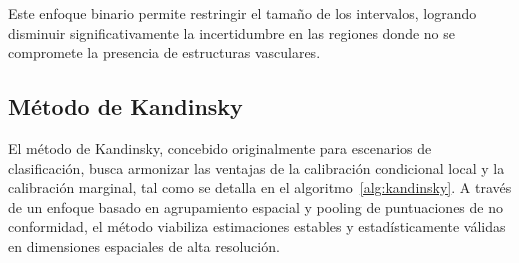 Este enfoque binario permite restringir el tamaño de los intervalos, logrando disminuir significativamente la incertidumbre en las regiones donde no se compromete la presencia de estructuras vasculares.

\subsection{Método de Kandinsky}

El método de Kandinsky, concebido originalmente para escenarios de clasificación, busca armonizar las ventajas de la calibración condicional local y la calibración marginal, tal como se detalla en el algoritmo~\ref{alg:kandinsky}. A través de un enfoque basado en agrupamiento espacial y pooling de puntuaciones de no conformidad, el método viabiliza estimaciones estables y estadísticamente válidas en dimensiones espaciales de alta resolución.

